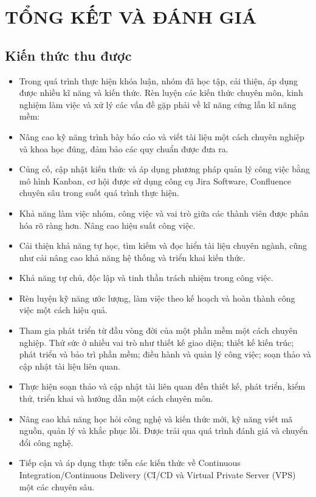 \chapter{TỔNG KẾT VÀ ĐÁNH GIÁ}

\section{Kiến thức thu được}

\begin{itemize}
    \item Trong quá trình thực hiện khóa luận, nhóm đã học tập, cải thiện, áp dụng được nhiều kĩ năng và kiến thức. Rèn luyện các kiến thức chuyên môn, kinh nghiệm làm việc và xử lý các vấn đề gặp phải về kĩ năng cứng lẫn kĩ năng mềm:
    \item Nâng cao kỹ năng trình bày báo cáo và viết tài liệu một cách chuyên nghiệp và khoa học đúng, đảm bảo các quy chuẩn được đưa ra.
    \item Củng cố, cập nhật kiến thức và áp dụng phương pháp quản lý công việc bằng mô hình Kanban, cơ hội được sử dụng công cụ Jira Software, Confluence chuyên sâu trong suốt quá trình thực hiện.
    \item Khả năng làm việc nhóm, công việc và vai trò giữa các thành viên được phân hóa rõ ràng hơn. Nâng cao hiệu suất công việc.
    \item Cải thiện khả năng tự học, tìm kiếm và đọc hiển tài liệu chuyên ngành, cũng như cải nâng cao khả năng hệ thống và triển khai kiến thức.
    \item Khả năng tự chủ, độc lập và tinh thần trách nhiệm trong công việc.
    \item Rèn luyện kỹ năng ước lượng, làm việc theo kế hoạch và hoàn thành công việc một cách hiệu quả.
    \item Tham gia phát triển từ đầu vòng đời của một phần mềm một cách chuyên nghiệp. Thử sức ở nhiều vai trò như thiết kế giao diện; thiết kế kiến trúc; phát triển và bảo trì phần mềm; điều hành và quản lý công việc; soạn thảo và cập nhật tài liệu liên quan.
    \item Thực hiện soạn thảo và cập nhật tài liên quan đến thiết kế, phát triển, kiểm thử, triển khai và hướng dẫn một cách chuyên môn.
    \item Nâng cao khả năng học hỏi công nghệ và kiến thức mới, kỹ năng viết mã nguồn, quản lý và khắc phục lỗi. Được trải qua quá trình đánh giá và chuyển đổi công nghệ.
    \item Tiếp cận và áp dụng thực tiễn các kiến thức về Continuous Integration/Continuous Delivery (CI/CD và Virtual Private Server (VPS) một các chuyên sâu.
\end{itemize}

